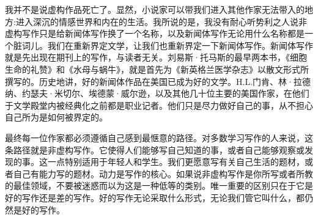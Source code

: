 我并不是说虚构作品死亡了。显然，小说家可以带我们进入其他作家无法带入的地方:进入深沉的情感世界和内在的生活。我所说的是，我没有耐心听势利之人说非虚构写作只是给新闻体写作换了一个名称，以及新闻体写作无论用什么名称都是一个脏词儿。我们在重新界定文学，让我们也重新界定一下新闻体写作。新闻体写作就是先出现在期刊上的写作，与读者无关。刘易斯·托马斯的最早两本书，《细胞生命的礼赞》和《水母与蜗牛》，就是首先为《新英格兰医学杂志》以散文形式所撰写的。历史地讲，好的新闻体作品在美国已成为好的文学。H.L.门肯、林·拉德纳、约瑟夫·米切尔、埃德蒙·威尔逊，以及其他几十位主要的美国作家，在他们于文学殿堂内被经典化之前都是职业记者。他们只是尽力做好自己的事，从不担心自己所为是如何被界定的。

最终每一位作家都必须遵循自己感到最惬意的路径。对多数学习写作的人来说，这条路径就是非虚构写作。它使得人们能够写自己知道的事，或者自己能够观察或发现的事。这一点特别适用于年轻人和学生。我们更愿意写有关自己生活的题材，或者自己有能力写的题材。动力是写作的核心。如果说非虚构写作是你所写或者所教的最佳领域，不要被迷惑而以为这是一种低等的类别。唯一重要的区别只在于它是好的写作还是差的写作。好的写作无论采取什么形式，无论我们管它叫什么，都仍然是好的写作。